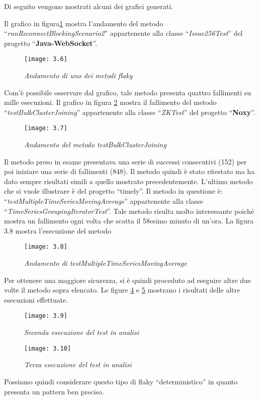 Di seguito vengono mostrati alcuni dei grafici generati.

Il grafico in figura\ref{fig:AndamentoFlaky} mostra l’andamento del metodo
“\emph{runReconnectBlockingScenario2}” appartenente alla classe “\emph{Issue256Test}” del progetto “\textbf{Java-WebSocket}”.
\begin{figure}[h]
	\centering
	\texttt{[image: 3.6]}
	\caption{\emph{Andamento di uno dei metodi flaky}}
	\label{fig:AndamentoFlaky}
\end{figure}

Com’è possibile osservare dal grafico, tale metodo presenta quattro fallimenti su mille esecuzioni.\newline
Il grafico in figura \ref{fig:fallimentobulk} mostra il fallimento del metodo “\emph{testBulkClusterJoining}” appartenente alla classe “\emph{ZKTest}” del progetto “\textbf{Noxy}”.
\begin{figure}[h]
	\centering
	\texttt{[image: 3.7]}
	\caption{\emph{Andamento del metodo testBulkClusterJoining}}
	\label{fig:fallimentobulk}
\end{figure}
\newline
Il metodo preso in esame presentava una serie di successi consecutivi (152) per poi iniziare una serie di fallimenti (848). Il metodo quindi è stato ritestato ma ha dato sempre risultati simili a quello mostrato precedentemente.
L’ultimo metodo che si vuole illustrare è del progetto “timely”. Il metodo in questione è: “\emph{testMultipleTimeSeriesMovingAverage}” appartenente alla classe
“\emph{TimeSeriesGroupingIteratorTest}”. Tale metodo risulta molto interessante poiché mostra un fallimento ogni volta che scatta il 58esimo minuto di un’ora.
La figura 3.8 mostra l’esecuzione del metodo
\begin{figure}[h]
	\centering
	\texttt{[image: 3.8]}
	\caption{\emph{Andamento di testMultipleTimeSeriesMovingAverage}}
	\label{fig:patternFlaky}
\end{figure}
Per ottenere una maggiore sicurezza, si è quindi proceduto ad eseguire altre due volte il metodo sopra elencato.
Le figure \ref{fig:riesecuzione1} e \ref{fig:riesecuzione2} mostrano i risultati delle altre esecuzioni effettuate.
\begin{figure}[h]
	\centering
	\texttt{[image: 3.9]}
	\caption{\emph{Seconda esecuzione del test in analisi}}
	\label{fig:riesecuzione1}
\end{figure}
\begin{figure}[h]
	\centering
	\texttt{[image: 3.10]}
	\caption{\emph{Terza esecuzione del test in analisi}}
	\label{fig:riesecuzione2}
\end{figure}
\newline
Possiamo quindi considerare questo tipo di flaky “deterministico” in quanto presenta un pattern ben preciso.
